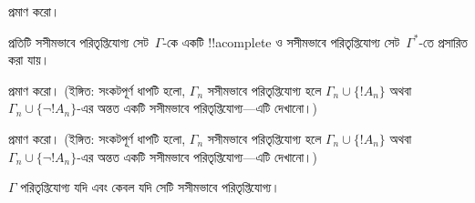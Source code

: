 \documentclass[../../../include/open-logic-section]{subfiles}
\begin{document}

\begin{prob}
 প্রমাণ করো।
\end{prob}
\tagendprob

\begin{lem}
 প্রতিটি সসীমভাবে পরিতৃপ্তিযোগ্য সেট~$\Gamma$-কে
একটি !!a{complete} ও সসীমভাবে পরিতৃপ্তিযোগ্য সেট~$\Gamma^*$-তে প্রসারিত
করা যায়।
\end{lem}

\begin{prob}
 প্রমাণ করো। (ইঙ্গিত: সংকটপূর্ণ
ধাপটি হলো, $\Gamma_n$ সসীমভাবে পরিতৃপ্তিযোগ্য হলে $\Gamma_n \cup
\{!A_n\}$ অথবা $\Gamma_n \cup \{\lnot !A_n\}$-এর অন্তত একটি সসীমভাবে
পরিতৃপ্তিযোগ্য—এটি দেখানো।)
\end{prob}
\tagendprob

\begin{prob}
 প্রমাণ করো। (ইঙ্গিত: সংকটপূর্ণ
ধাপটি হলো, $\Gamma_n$ সসীমভাবে পরিতৃপ্তিযোগ্য হলে $\Gamma_n \cup
\{!A_n\}$ অথবা $\Gamma_n \cup \{\lnot !A_n\}$-এর অন্তত একটি সসীমভাবে
পরিতৃপ্তিযোগ্য—এটি দেখানো।)
\end{prob}
\tagendprob

\begin{thm}[সংহতি]
 $\Gamma$ পরিতৃপ্তিযোগ্য যদি এবং কেবল
যদি সেটি সসীমভাবে পরিতৃপ্তিযোগ্য।
\end{thm}
\end{document}
